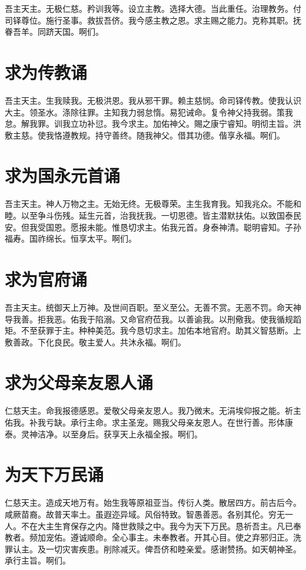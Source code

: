 \documentclass[UTF8,17pt]{ctexart}
\begin{document}
吾主天主。⽆极仁慈。矜训我等。设⽴主教。选择⼤德。当此重任。治理教务。付司铎尊位。施⾏圣事。救拔吾侪。我今感主教之恩。求主赐之能⼒。克称其职。抚眷吾⽺。同跻天国。啊们。

\section{求为传教诵}

吾主天主。⽣我赎我。⽆极洪恩。我从邪⼲罪。赖主慈悯。命司铎传教。使我认识⼤主。领圣⽔。涤除往罪。主知我⼒弱怠惰。易犯诫命。复令神⽗持我弱。策我怠。解我罪。训我⽴功补愆。我今求主。加佑神⽗。賜之康宁睿知。明彻主旨。洪敷主慈。使我恪遵教规。持守善终。随我神⽗。借其功德。偕享永福。啊们。

\section{求为国永元⾸诵}

吾主天主。神⼈万物之主。⽆始⽆终。⽆极尊荣。主⽣我育我。知我兆众。不能和睦。以⾄争⽃伤残。延⽣元⾸，治我抚我。⼀切恩德。皆主潜默扶佑。以致国泰民安。但我受国恩。愿报未能。惟恳切求主。佑我元⾸。⾝泰神清。聪明睿知。⼦孙福寿。国祚绵长。恒享太平。啊们。

\section{求为官府诵}

吾主天主。统御天上万神。及世间百职。⾄义⾄公。⽆善不赏。⽆恶不罚。命天神导我善。拒我恶。佑我于陷溺。又命官府莅我。以善谕我。以刑儆我。使我循规蹈矩。不⾄获罪于主。种种美范。我今恳切求主。加佑本地官府。助其义智慈断。上敷善政。下化良民。敬主爱⼈。共沐永福。啊们。

\section{求为⽗母亲友恩⼈诵}

仁慈天主。命我报德感恩。爱敬⽗母亲友恩⼈。我乃微末。⽆涓埃仰报之能。祈主佑我。补我亏缺。承⾏主命。求主圣宠。赐我⽗母亲友恩⼈。在世⾏善。形体康泰。灵神洁净。以⾄⾝后。获享天上永福全报。啊们。

\section{为天下万民诵}

仁慈天主。造成天地万有。始⽣我等原祖亚当。传衍⼈类。散居四⽅。前古后今。咸厥苗裔。故普天率⼟。虽遐迩异域。风俗特致。智愚善恶。各别其伦。穷⽆⼀⼈。不在⼤主⽣育保存之内。降世救赎之中。我今为天下万民。恳祈吾主。凡已奉教者。频加宠佑。遵诚顺命。全⼼事主。未奉教者。开其⼼⽬。使之弃邪归正。洗罪认主。及⼀切灾害疾患。削除减灭。俾吾侪和睦亲爱。感谢赞扬。如天朝神圣。承⾏主旨。啊们。
\end{document}
